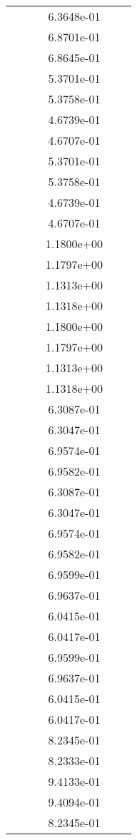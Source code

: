 \begin{xltabular}{\textwidth}{r|rS[table-format=1.3e+2]S[table-format=1.4e+2]S[table-format=1.4e+2]S[table-format=-1.5]}
&  &  & 6.3648e-01 & & \\
&  &  & 6.8701e-01 & & \\
&  &  & 6.8645e-01 & & \\
&  &  & 5.3701e-01 & & \\
&  &  & 5.3758e-01 & & \\
&  &  & 4.6739e-01 & & \\
&  &  & 4.6707e-01 & & \\
&  &  & 5.3701e-01 & & \\
&  &  & 5.3758e-01 & & \\
&  &  & 4.6739e-01 & & \\
&  &  & 4.6707e-01 & & \\
&  &  & 1.1800e+00 & & \\
&  &  & 1.1797e+00 & & \\
&  &  & 1.1313e+00 & & \\
&  &  & 1.1318e+00 & & \\
&  &  & 1.1800e+00 & & \\
&  &  & 1.1797e+00 & & \\
&  &  & 1.1313e+00 & & \\
&  &  & 1.1318e+00 & & \\
&  &  & 6.3087e-01 & & \\
&  &  & 6.3047e-01 & & \\
&  &  & 6.9574e-01 & & \\
&  &  & 6.9582e-01 & & \\
&  &  & 6.3087e-01 & & \\
&  &  & 6.3047e-01 & & \\
&  &  & 6.9574e-01 & & \\
&  &  & 6.9582e-01 & & \\
&  &  & 6.9599e-01 & & \\
&  &  & 6.9637e-01 & & \\
&  &  & 6.0415e-01 & & \\
&  &  & 6.0417e-01 & & \\
&  &  & 6.9599e-01 & & \\
&  &  & 6.9637e-01 & & \\
&  &  & 6.0415e-01 & & \\
&  &  & 6.0417e-01 & & \\
&  &  & 8.2345e-01 & & \\
&  &  & 8.2333e-01 & & \\
&  &  & 9.4133e-01 & & \\
&  &  & 9.4094e-01 & & \\
&  &  & 8.2345e-01 & & \\

\end{xltabular}

